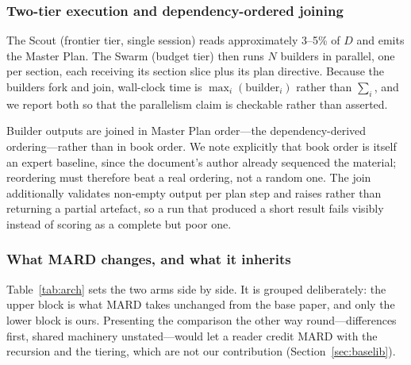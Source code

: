 \documentclass[conference]{IEEEtran}
\begin{document}
\subsubsection{Two-tier execution and dependency-ordered joining}
The Scout (frontier tier, single session) reads approximately 3--5\% of $D$
and emits the Master Plan. The Swarm (budget tier) then runs $N$ builders in
parallel, one per section, each receiving its section slice plus its plan
directive. Because the builders fork and join, wall-clock time is
$\max_i(\mathrm{builder}_i)$ rather than $\sum_i$, and we report both so that
the parallelism claim is checkable rather than asserted.

Builder outputs are joined in Master Plan order---the dependency-derived
ordering---rather than in book order. We note explicitly that book order is
itself an expert baseline, since the document's author already sequenced the
material; reordering must therefore beat a real ordering, not a random one.
The join additionally validates non-empty output per plan step and raises
rather than returning a partial artefact, so a run that produced a short
result fails visibly instead of scoring as a complete but poor one.

\subsubsection{What MARD changes, and what it inherits}
\label{sec:comparison}
Table~\ref{tab:arch} sets the two arms side by side. It is grouped deliberately: the
upper block is what MARD takes unchanged from the base paper, and only the lower
block is ours. Presenting the comparison the other way round---differences
first, shared machinery unstated---would let a reader credit MARD with the
recursion and the tiering, which are not our contribution
(Section~\ref{sec:baselib}).
\end{document}
